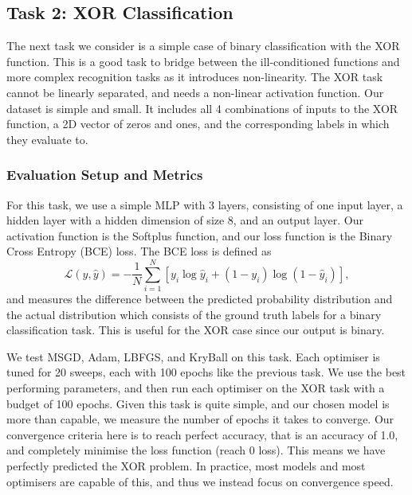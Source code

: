 \subsection{Task 2: XOR Classification}
\label{ssec:task_2_xor_classification}

The next task we consider is a simple case of binary classification with the XOR function. This is a good task to bridge between the ill-conditioned functions and more complex recognition tasks as it introduces non-linearity. The XOR task cannot be linearly separated, and needs a non-linear activation function. Our dataset is simple and small. It includes all 4 combinations of inputs to the XOR function, a 2D vector of zeros and ones, and the corresponding labels in which they evaluate to.

\subsubsection{Evaluation Setup and Metrics}
\label{sssec:task_2_evaluation_setup_and_metrics}
For this task, we use a simple MLP with 3 layers, consisting of one input layer, a hidden layer with a hidden dimension of size 8, and an output layer. Our activation function is the Softplus function, and our loss function is the Binary Cross Entropy (BCE) loss. The BCE loss is defined as
\begin{equation}
\mathcal{L}(y, \hat{y}) = -\frac{1}{N} \sum_{i=1}^N \left[ y_i \log \hat{y}_i + (1 - y_i) \log (1 - \hat{y}_i) \right],
\end{equation}
and measures the difference between the predicted probability distribution and the actual distribution which consists of the ground truth labels for a binary classification task. This is useful for the XOR case since our output is binary.

We test MSGD, Adam, LBFGS, and KryBall on this task. Each optimiser is tuned for 20 sweeps, each with 100 epochs like the previous task. We use the best performing parameters, and then run each optimiser on the XOR task with a budget of 100 epochs. Given this task is quite simple, and our chosen model is more than capable, we measure the number of epochs it takes to converge. Our convergence criteria here is to reach perfect accuracy, that is an accuracy of 1.0, and completely minimise the loss function (reach 0 loss). This means we have perfectly predicted the XOR problem. In practice, most models and most optimisers are capable of this, and thus we instead focus on convergence speed. 

